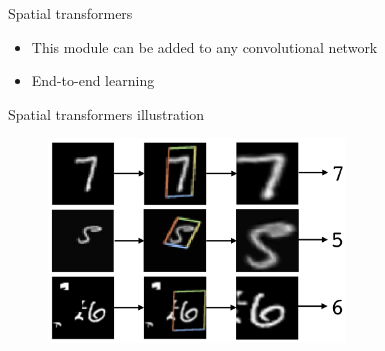 \documentclass[xcolor=pdftex,dvipsnames,table,mathserif]{beamer}
\begin{document}
\begin{frame}{Spatial transformers~\cite{jaderberg_spatial_2016}}
  \vspace{1cm}

  \begin{block}{}
    \begin{itemize}
    \item This module can be added to any convolutional network
    \item End-to-end learning
    \end{itemize}


  \end{block}



\end{frame}

\begin{frame}{Spatial transformers illustration}

  \begin{figure}[ht]
    \centering
    \includegraphics[width=0.7\textwidth]{spatial_transformer_res}
  \end{figure}
\end{frame}
\end{document}
